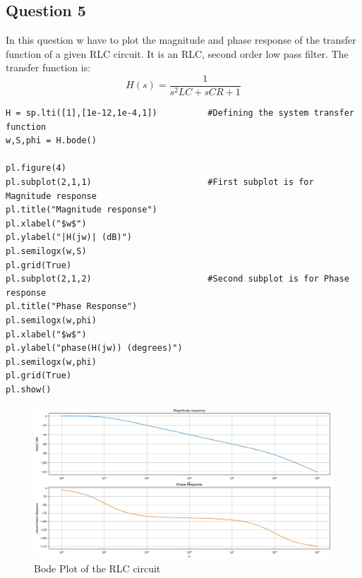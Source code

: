 \documentclass[11pt, a4paper]{article}
\begin{document}
\subsection{Question 5}
    In this question w have to plot the magnitude and phase response of the transfer function of a given RLC circuit. It is an RLC, second order low pass filter. The transfer function is:
    \begin{equation}
        H(s) = \frac{1}{s^2LC + sCR + 1}
    \end{equation}
    \begin{verbatim}
H = sp.lti([1],[1e-12,1e-4,1])          #Defining the system transfer function
w,S,phi = H.bode()

pl.figure(4)
pl.subplot(2,1,1)                       #First subplot is for Magnitude response
pl.title("Magnitude response")
pl.xlabel("$w$")
pl.ylabel("|H(jw)| (dB)")
pl.semilogx(w,S)
pl.grid(True)
pl.subplot(2,1,2)                       #Second subplot is for Phase response
pl.title("Phase Response")
pl.semilogx(w,phi)
pl.xlabel("$w$")
pl.ylabel("phase(H(jw)) (degrees)")
pl.semilogx(w,phi)
pl.grid(True)
pl.show()
    \end{verbatim}
    \begin{figure}[!h]
        \centering
        \includegraphics[scale = 0.43]{Figure 5.png}
        \caption{Bode Plot of the RLC circuit}
        \label{fig:Figure 5}
    \end{figure}
\end{document}

